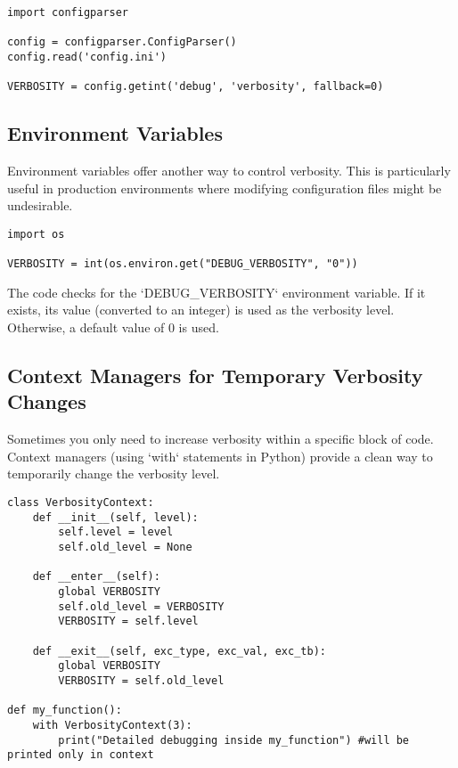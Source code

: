 \documentclass{article}
\begin{document}
{{{\begin{itemize}
\begin{verbatim}
import configparser

config = configparser.ConfigParser()
config.read('config.ini')

VERBOSITY = config.getint('debug', 'verbosity', fallback=0)
\end{verbatim}

\end{itemize}

\subsection*{Environment Variables}

Environment variables offer another way to control verbosity. This is particularly useful in production environments where modifying configuration files might be undesirable.

\begin{verbatim}
import os

VERBOSITY = int(os.environ.get("DEBUG_VERBOSITY", "0"))
\end{verbatim}

The code checks for the `DEBUG_VERBOSITY` environment variable. If it exists, its value (converted to an integer) is used as the verbosity level. Otherwise, a default value of 0 is used.

\subsection*{Context Managers for Temporary Verbosity Changes}

Sometimes you only need to increase verbosity within a specific block of code. Context managers (using `with` statements in Python) provide a clean way to temporarily change the verbosity level.

\begin{verbatim}
class VerbosityContext:
    def __init__(self, level):
        self.level = level
        self.old_level = None

    def __enter__(self):
        global VERBOSITY
        self.old_level = VERBOSITY
        VERBOSITY = self.level

    def __exit__(self, exc_type, exc_val, exc_tb):
        global VERBOSITY
        VERBOSITY = self.old_level

def my_function():
    with VerbosityContext(3):
        print("Detailed debugging inside my_function") #will be printed only in context
\end{verbatim}

}}}
\end{document}
